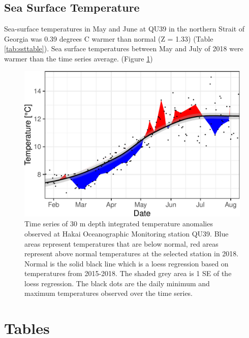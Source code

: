 \documentclass[fleqn,10pt]{wlpeerj} %
\begin{document}
\subsection*{Sea Surface Temperature}\label{sea-surface-temperature}

Sea-surface temperatures in May and June at QU39 in the northern Strait
of Georgia was 0.39 degrees C warmer than normal (Z = 1.33) (Table
\ref{tab:ssttable}). Sea surface temperatures between May and July of
2018 were warmer than the time series average. (Figure \ref{fig:sst})

\begin{figure}[H]
\includegraphics[width=0.8\linewidth]{peer_j_migration_dynamics_files/figure-latex/sst-1} \caption{Time series of 30 m depth integrated temperature anomalies observed at Hakai Oceanographic Monitoring station QU39. Blue areas represent temperatures that are below normal, red areas represent above normal temperatures at the selected station in 2018. Normal is the solid black line which is a loess regression based on temperatures from 2015-2018. The shaded grey area is 1 SE of the loess regression. The black dots are the daily minimum and maximum temperatures observed over the time series.}\label{fig:sst}
\end{figure}

\section*{Tables}\label{tables}
\end{document}
